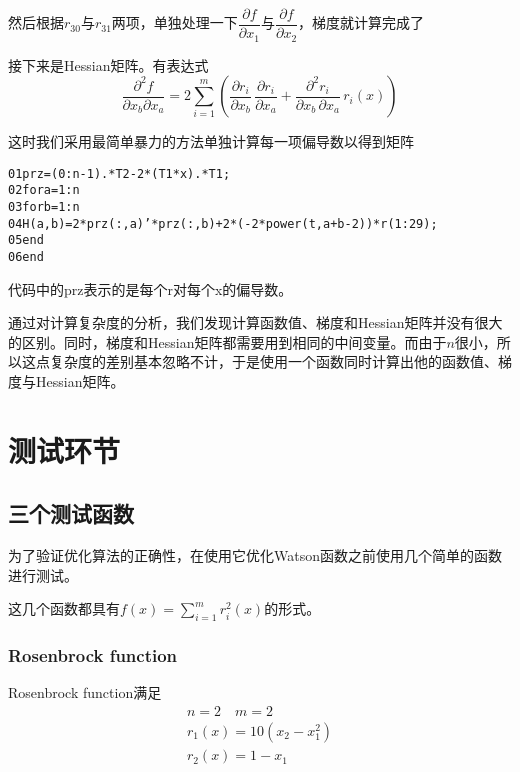 \documentclass[11pt, a4paper]{article}
\begin{document}
然后根据$r_{30}$与$r_{31}$两项，单独处理一下$\dfrac{\partial f}{\partial x_1}$与$\dfrac{\partial f}{\partial x_2}$，梯度就计算完成了

接下来是Hessian矩阵。有表达式
\[
\frac{\partial^2 f}{\partial x_b \partial x_a}=2\sum_{i=1}^{m}\left(\frac{\partial r_i}{\partial x_b}\,\frac{\partial r_i}{\partial x_a}+\frac{\partial^2r_i}{\partial x_b\,\partial x_a}\,r_i(x)\right)
\]

这时我们采用最简单暴力的方法单独计算每一项偏导数以得到矩阵

\begin{framed}
\begin{alltt}
	01 prz = (0:n-1) .* T2 - 2 * (T1 * x) .* T1;
	02 for a = 1:n
	03     for b = 1:n
	04 	       H(a, b)=2*prz(:,a)'*prz(:,b)+2*(-2*power(t,a+b-2))*r(1:29);
	05     end
	06 end
\end{alltt}
\end{framed}

代码中的prz表示的是每个r对每个x的偏导数。

通过对计算复杂度的分析，我们发现计算函数值、梯度和Hessian矩阵并没有很大的区别。同时，梯度和Hessian矩阵都需要用到相同的中间变量。而由于$n$很小，所以这点复杂度的差别基本忽略不计，于是使用一个函数同时计算出他的函数值、梯度与Hessian矩阵。

\section{测试环节}

\subsection{三个测试函数}

为了验证优化算法的正确性，在使用它优化Watson函数之前使用几个简单的函数进行测试。

这几个函数都具有\(f(x)=\sum_{i=1}^m r_i^2(x)\)的形式。

\subsubsection{Rosenbrock function}
Rosenbrock function\cite{doi:10.1093/comjnl/3.3.175}满足
\begin{equation*}
\begin{array}{c}
n=2\quad m=2\\
r_1(x)=10(x_2-x_1^2)\\
r_2(x)=1-x_1
\end{array}
\end{equation*}
\end{document}
